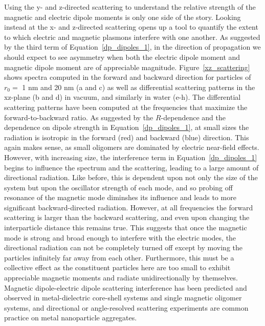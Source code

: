 \documentclass[journal=apchd5,manuscript=article]{achemso}
\begin{document}
Using the y- and z-directed scattering to understand the relative strength of the magnetic and electric dipole moments is only one side of the story. Looking instead at the x- and z-directed scattering opens up a tool to quantify the extent to which electric and magnetic plasmons interfere with one another. As suggested by the third term of Equation~\ref{dp_dipoles_1}, in the direction of propagation we should expect to see asymmetry when both the electric dipole moment and magnetic dipole moment are of appreciable magnitude. Figure~\ref{xz_scattering} shows spectra computed in the forward and backward direction for particles of $r_0 = $ 1 nm and 20 nm (a and c) as well as differential scattering patterns in the xz-plane (b and d) in vacuum, and similarly in water (e-h). The differential scattering patterns have been computed at the frequencies that maximize the forward-to-backward ratio. As suggested by the $R$-dependence and the dependence on dipole strength in Equation~\ref{dp_dipoles_1}, at small sizes the radiation is isotropic in the forward (red) and backward (blue) direction. This again makes sense, as small oligomers are dominated by electric near-field effects. However, with increasing size, the interference term in Equation~\ref{dp_dipoles_1} begins to influence the spectrum and the scattering, leading to a large amount of directional radiation. Like before, this is dependent upon not only the size of the system but upon the oscillator strength of each mode, and so probing off resonance of the magnetic mode diminshes its influence and leads to more significant backward-directed radiation. However, at all frequencies the forward scattering is larger than the backward scattering, and even upon changing the interparticle distance this remains true. This suggests that once the magnetic mode is strong and broad enough to interfere with the electric modes, the directional radiation can not be completely turned off except by moving the particles infinitely far away from each other. Furthermore, this must be a collective effect as the constituent particles here are too small to exhibit appreciable magnetic moments and radiate unidirectionally by themselves. Magnetic dipole-electric dipole scattering interference has been predicted and observed in metal-dielectric core-shell systems and single magnetic oligomer systems, and directional or angle-resolved scattering experiments are common practice on metal nanoparticle aggregates.\cite{Dionne2011,Kivshar2012,Polman2014,Smith2014,Tsutomu2017}
\end{document}
